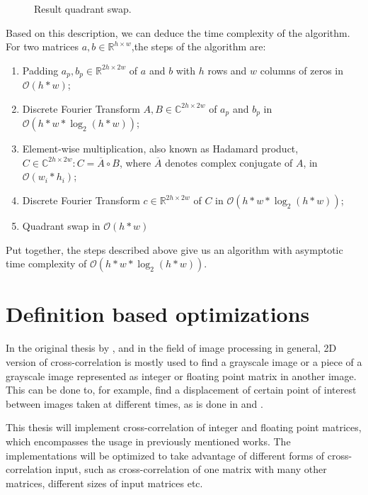 \begin{figure}[h]
	\centering
	\def\svgwidth{0.8\textwidth}
	
	\caption{Result quadrant swap.}
	\label{fig:quadrant_swap}
\end{figure}


Based on this description, we can deduce the time complexity of the algorithm. For two matrices $a,b \in \mathbb{R}^{h \times w}$,the steps of the algorithm are:
\begin{enumerate}
	\item Padding $a_p, b_p \in \mathbb{R}^{2h \times 2w}$ of $a$ and $b$ with $h$ rows and $w$ columns of zeros in $\mathcal{O}(h*w)$;
	\item Discrete Fourier Transform $A,B 
	\in \mathbb{C}^{2h \times 2w}$ of $a_p$ and $b_p$ in $\mathcal{O}(h*w*\log_2(h*w))$;
	\item Element-wise multiplication, also known as Hadamard product, $C \in \mathbb{C}^{2h \times 2w}: C = \overline{A} \circ B$, where $\overline{A}$ denotes complex conjugate of $A$, in $\mathcal{O}(w_i*h_i)$;
	\item Discrete Fourier Transform $c \in \mathbb{R}^{2h \times 2w}$ of $C$ in $\mathcal{O}(h*w*\log_2(h*w))$;
	\item Quadrant swap in $\mathcal{O}(h*w)$
\end{enumerate}

Put together, the steps described above give us an algorithm with asymptotic time complexity of $\mathcal{O}(h*w*\log_2(h*w))$.

\section{Definition based optimizations}
In the original thesis by \citep{misko}, and in the field of image processing in general, 2D version of cross-correlation is mostly used to find a grayscale image or a piece of a grayscale image represented as integer or floating point matrix in another image. This can be done to, for example, find a displacement of certain point of interest between images taken at different times, as is done in \citet{misko} and \citet{zhang2015}. 

This thesis will implement cross-correlation of integer and floating point matrices, which encompasses the usage in previously mentioned works. The implementations will be optimized to take advantage of different forms of cross-correlation input, such as cross-correlation of one matrix with many other matrices, different sizes of input matrices etc. 

